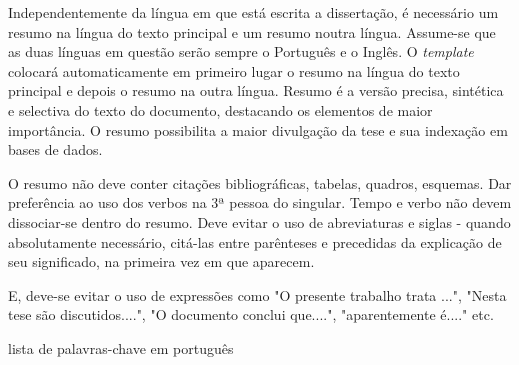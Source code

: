 \abstractPT  %

Independentemente da língua em que está escrita a dissertação, é necessário um resumo na língua do texto principal e um resumo noutra língua.  Assume-se que as duas línguas em questão serão sempre o Português e o Inglês. O \emph{template} colocará automaticamente em primeiro lugar o resumo na língua do texto principal e depois o resumo na outra língua.  
Resumo é a versão precisa, sintética e selectiva do texto do documento, destacando os elementos de maior importância. O resumo possibilita a maior divulgação da tese e sua indexação em bases de dados.

O resumo não deve conter citações bibliográficas, tabelas, quadros, esquemas. Dar preferência ao uso dos verbos na 3ª pessoa do singular. Tempo e verbo não devem dissociar-se dentro do resumo. Deve evitar o uso de abreviaturas e siglas - quando absolutamente necessário, citá-las entre parênteses e precedidas da explicação de seu significado, na primeira vez em que aparecem. 

E, deve-se evitar o uso de expressões como "O presente trabalho trata ...", "Nesta tese são discutidos....", "O documento conclui que....", "aparentemente é...." etc. 

\begin{keywords}
lista de palavras-chave em português
\end{keywords}
